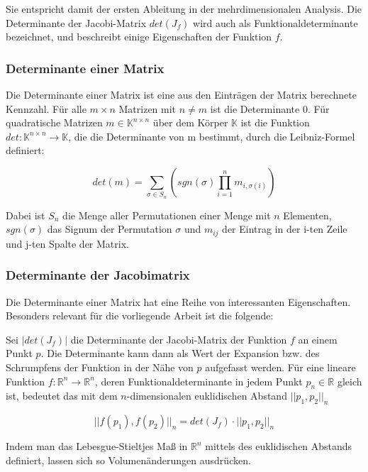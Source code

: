 \documentclass[a4paper,fontsize=12pt,toc=bib,halfparskip]{scrartcl}
\begin{document}
Sie entspricht damit der ersten Ableitung in der mehrdimensionalen Analysis. Die Determinante der Jacobi-Matrix $det(J_f)$ wird auch als Funktionaldeterminante bezeichnet, und beschreibt einige Eigenschaften der Funktion $f$. 

\subsubsection{Determinante einer Matrix}
Die Determinante einer Matrix ist eine aus den Eintr\"agen der Matrix berechnete Kennzahl. F\"ur alle $m\times n$ Matrizen mit $n \neq m$ ist die Determinante 0. F\"ur quadratische Matrizen $m \in \mathbb{K}^{n\times n}$ \"uber dem K\"orper $\mathbb{K}$ ist die Funktion $det: \mathbb{K}^{n\times n} \rightarrow \mathbb{K}$, die die Determinante von m bestimmt, durch die Leibniz-Formel definiert:

\begin{equation}
	det(m) = \sum_{\sigma \in S_n} \left( sgn(\sigma) \prod_{i=1}^{n} m_{i,\sigma(i)}\right)
\end{equation}

Dabei ist $S_n$ die Menge aller Permutationen einer Menge mit $n$ Elementen, $sgn(\sigma)$ das Signum der Permutation $\sigma$ und $m_{ij}$ der Eintrag in der i-ten Zeile und j-ten Spalte der Matrix.

\subsubsection{Determinante der Jacobimatrix}
Die Determinante einer Matrix hat eine Reihe von interessanten Eigenschaften. Besonders relevant f\"ur die vorliegende Arbeit ist die folgende:

Sei $|det(J_f)|$ die Determinante der Jacobi-Matrix der Funktion $f$ an einem Punkt $p$. Die Determinante kann dann als Wert der Expansion bzw. des Schrumpfens der Funktion in der N\"ahe von $p$ aufgefasst werden. F\"ur eine lineare Funktion $f: \mathbb{R}^n\rightarrow \mathbb{R}^n$, deren Funktionaldeterminante in jedem Punkt $p_n \in \mathbb{R}$ gleich ist, bedeutet das mit dem $n$-dimensionalen euklidischen Abstand $||p_1, p_2||_n$

\begin{equation}
||f(p_1), f(p_2)||_n = det(J_f)\cdot||p_1, p_2||_n
\end{equation}

Indem man das Lebesgue-Stieltjes Ma{\ss} in $\mathbb{R}^n$ mittels des euklidischen Abstands definiert, lassen sich so Volumen\"anderungen ausdr\"ucken.
\end{document}
